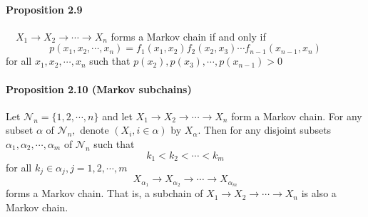 \documentclass[8pt]{article}
\begin{document}
\paragraph{Proposition 2.9} $\quad X_{1} \rightarrow X_{2} \rightarrow \cdots \rightarrow X_{n}$ forms a Markov chain if and only if
$$
p\left(x_{1}, x_{2}, \cdots, x_{n}\right)=f_{1}\left(x_{1}, x_{2}\right) f_{2}\left(x_{2}, x_{3}\right) \cdots f_{n-1}\left(x_{n-1}, x_{n}\right)
$$
for all $x_{1}, x_{2}, \cdots, x_{n}$ such that $p\left(x_{2}\right), p\left(x_{3}\right), \cdots, p\left(x_{n-1}\right)>0$

\paragraph{Proposition 2.10 (Markov subchains)} Let $\mathcal{N}_{n}=\{1,2, \cdots, n\}$ and let $X_{1} \rightarrow X_{2} \rightarrow \cdots \rightarrow X_{n}$ form a Markov chain. For any subset $\alpha$ of $\mathcal{N}_{n},$ denote $\left(X_{i}, i \in \alpha\right)$ by $X_{\alpha} .$ Then for any disjoint subsets $\alpha_{1}, \alpha_{2}, \cdots, \alpha_{m}$ of $\mathcal{N}_{n}$ such that
$$
k_{1}<k_{2}<\cdots<k_{m}
$$
for all $k_{j} \in \alpha_{j}, j=1,2, \cdots, m$
$$
X_{\alpha_{1}} \rightarrow X_{\alpha_{2}} \rightarrow \cdots \rightarrow X_{\alpha_{m}}
$$
forms a Markov chain. That is, a subchain of $X_{1} \rightarrow X_{2} \rightarrow \cdots \rightarrow X_{n}$ is also a Markov chain.

\end{document}
